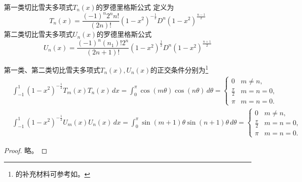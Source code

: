 \begin{subappendices}
\begin{theorem}[切比雪夫多项式的罗德里格斯公式]
  第一类切比雪夫多项式$T_n(x)$的罗德里格斯公式 定义为
  \begin{equation}
    \label{eq:poly-chebyshev-1-rodrigues-formula}
    T_n(x)= \frac{(-1)^n 2^n n!}{(2n)!} \left( 1-x^2 \right)^{-\frac{1}{2}} D^n  \left( 1-x^2 \right)^{\frac{n-1}{2}}
  \end{equation}
  第二类切比雪夫多项式$U_n(x)$的罗德里格斯公式
  \begin{equation}
    \label{eq:poly-chebyshev-2-rodrigues-formula}
    U_n(x)= \frac{(-1)^n (n_1)! 2^n }{(2n+1)!} \left( 1-x^2 \right)^{\frac{1}{2}} D^n  \left( 1-x^2 \right)^{\frac{n+1}{2}}
  \end{equation}
\end{theorem}

\begin{theorem}[切比雪夫多项式的正交条件]
  第一类、第二类切比雪夫多项式$T_n(x), U_n(x)$的正交条件分别为\citep[Entry 7.343.1, pp.807-808]{Gradshteyn:2014uy}\footnote{\cite{Gradshteyn:2014uy}的补充材料可参考如\cite{Moll:2015uy, Moll:2016tq}。}
  \begin{align}
    \label{eq:poly-chebyshev-1-ortho-condition}
    & \int_{-1}^{1} \left( 1-x^2 \right)^{-\frac{1}{2}} T_m(x) T_n(x) \, dx = \int_{0}^{\pi} \cos(m \theta) \cos(n \theta) \, d \theta =\begin{cases}
0 & m\neq n, \\
\frac{\pi}{2} & m=n=0, \\
\pi & m=n=0.
    \end{cases} \\
    \label{eq:poly-chebyshev-2-ortho-condition}
    & \int_{-1}^{1} \left( 1-x^2 \right)^{-\frac{1}{2}} U_m(x) U_n(x) \, dx = \int_{0}^{\pi} \sin(m+1) \theta \sin(n +1) \theta \, d \theta =\begin{cases}
    0 & m\neq n, \\
    \frac{\pi}{2} & m=n=0, \\
    \pi & m=n=0.
    \end{cases}
  \end{align}
\end{theorem}
\begin{proof}
  略。
\end{proof}


\end{subappendices}
